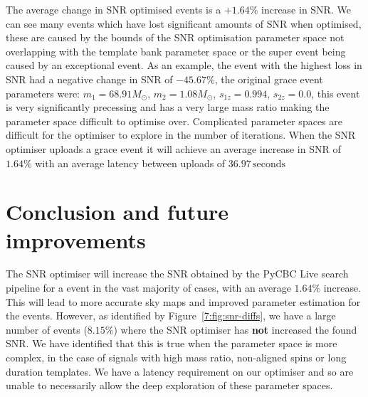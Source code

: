 %
The average change in SNR optimised events is a $+1.64\%$ increase in SNR. We can see many events which have lost significant amounts of SNR when optimised, these are caused by the bounds of the SNR optimisation parameter space not overlapping with the template bank parameter space or the super event being caused by an exceptional event. As an example, the event with the highest loss in SNR had a negative change in SNR of $-45.67\%$, the original grace event parameters were: $m_{1} = 68.91 M_{\odot}$, $m_{2} = 1.08 M_{\odot}$, $s_{1z} = 0.994$, $s_{2z} = 0.0$, this event is very significantly precessing and has a very large mass ratio making the parameter space difficult to optimise over. Complicated parameter spaces are difficult for the optimiser to explore in the number of iterations. When the SNR optimiser uploads a grace event it will achieve an average increase in SNR of $1.64\%$ with an average latency between uploads of $36.97 \, \text{seconds}$

\section{\label{7:sec:conclusion}Conclusion and future improvements}

The SNR optimiser will increase the SNR obtained by the PyCBC Live search pipeline for a \gwadj event in the vast majority of cases, with an average $1.64\%$ increase. This will lead to more accurate sky maps and improved parameter estimation for the \gwadj events. However, as identified by Figure~\ref{7:fig:snr-diffs}, we have a large number of events ($8.15\%$) where the SNR optimiser has \textbf{not} increased the found SNR. We have identified that this is true when the parameter space is more complex, in the case of signals with high mass ratio, non-aligned spins or long duration templates. We have a latency requirement on our optimiser and so are unable to necessarily allow the deep exploration of these parameter spaces.


